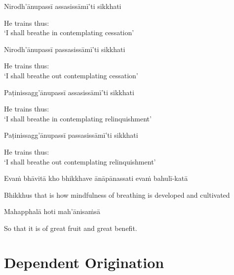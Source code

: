 Nirodh'ānupassī assasissāmī'ti sikkhati

\begin{english}
  He trains thus:\\
  `I shall breathe in contemplating cessation'
\end{english}

Nirodh'ānupassī passasissāmī'ti sikkhati

\begin{english}
  He trains thus:\\
  `I shall breathe out contemplating cessation'
\end{english}

Paṭinissagg'ānupassī assasissāmī'ti sikkhati

\begin{english}
  He trains thus:\\
  `I shall breathe in contemplating relinquishment'
\end{english}

Paṭinissagg'ānupassī passasissāmī'ti sikkhati

\begin{english}
  He trains thus:\\
  `I shall breathe out contemplating relinquishment'
\end{english}

Evaṁ bhāvitā kho bhikkhave ānāpānassati evaṁ bahulī-katā

\begin{english-hang}
  Bhikkhus that is how mindfulness of breathing is developed and cultivated
\end{english-hang}

Mahapphalā hoti mah'ānisaṁsā

\begin{english}
  So that it is of great fruit and great benefit.
\end{english}

\suttaRef{[MN 118]}


\section{Dependent Origination}
\label{dependent-origination}

